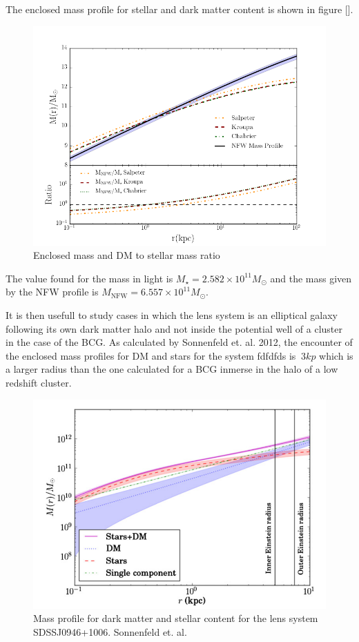 The enclosed mass profile for stellar and dark matter content is shown in figure [].

\begin{figure}[H]
\centering
\includegraphics[width=12cm]{images/DM_fraction_all_IMFs.png}
\caption[Enclosed mass and DM to stellar mass ratio]{Enclosed mass and DM to stellar mass ratio}
\end{figure}

The value found for the mass in light is $M_{\star}=2.582\times 10^{11}M_{\odot}$ and the mass given by the NFW profile is $M_{\text{NFW}}=6.557\times 10^{11}M_{\odot}$.

It is then usefull to study cases in which the lens system is an elliptical galaxy following its own dark matter halo and not inside the potential well of a cluster in the case of the BCG. As calculated by Sonnenfeld et. al. 2012, the encounter of the enclosed mass profiles for DM and stars for the system fdfdfds is $~3kp$ which is a larger radius than the one calculated for a BCG inmerse in the halo of a low redshift cluster.  

\begin{figure}[H]
\centering
\includegraphics[width=12cm]{images/sonnenfeld_galaxy.png}
\caption[DM and Stellar mass profiles for a massive early type galaxy.]{Mass profile for dark matter and stellar content for the lens system SDSSJ0946+1006. Sonnenfeld et. al. \citeyear{Reference15}}
\end{figure}

